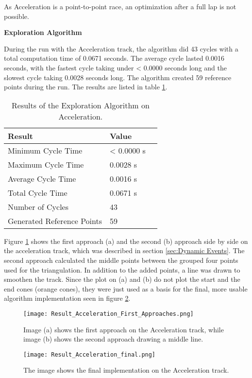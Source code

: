 As Acceleration is a point-to-point race, an optimization after a full lap is not possible.

\textbf{Exploration Algorithm}

During the run with the Acceleration track, the algorithm did 43 cycles with a total computation time of 0.0671 seconds. The average cycle lasted 0.0016 seconds, with the fastest cycle taking under < 0.0000 seconds long and the slowest cycle taking 0.0028 seconds long. The algorithm created 59 reference points during the run. The results are listed in table \ref{tab:Results Acceleration Exploration}.

\begin{table}[H]
    \centering
    \begin{tabular}{|l|l|l|}
        \hline
        \textbf{Result}            & \textbf{Value} \\ \hline
        Minimum Cycle Time         & < 0.0000 s     \\ \hline
        Maximum Cycle Time         & 0.0028 s       \\ \hline
        Average Cycle  Time        & 0.0016 s       \\ \hline
        Total Cycle Time           & 0.0671 s       \\ \hline
        Number of Cycles           & 43             \\ \hline
        Generated Reference Points & 59             \\ \hline
    \end{tabular}
    \caption{Results of the Exploration Algorithm on Acceleration.}
    \label{tab:Results Acceleration Exploration}
\end{table}

Figure \ref{fig:Result Acceleration First Approaches} shows the first approach (a) and the second (b) approach side by side on the acceleration track, which was described in section \ref{sec:Dynamic Events}. The second approach calculated the middle points between the grouped four points used for the triangulation. In addition to the added points, a line was drawn to smoothen the track. Since the plot on (a) and (b) do not plot the start and the end cones (orange cones), they were just used as a basis for the final, more usable algorithm implementation seen in figure \ref{fig:Result Acceleration Final}. 
\begin{figure}[H]
    \centering
    \texttt{[image: Result\_Acceleration\_First\_Approaches.png]}
    \caption{Image (a) shows the first approach on the Acceleration track, while image (b) shows the second approach drawing a middle line.}
    \label{fig:Result Acceleration First Approaches}
\end{figure}
\begin{figure}[H]
    \centering
    \texttt{[image: Result\_Acceleration\_final.png]}
    \caption{The image shows the final implementation on the Acceleration track.}
    \label{fig:Result Acceleration Final}
\end{figure}

